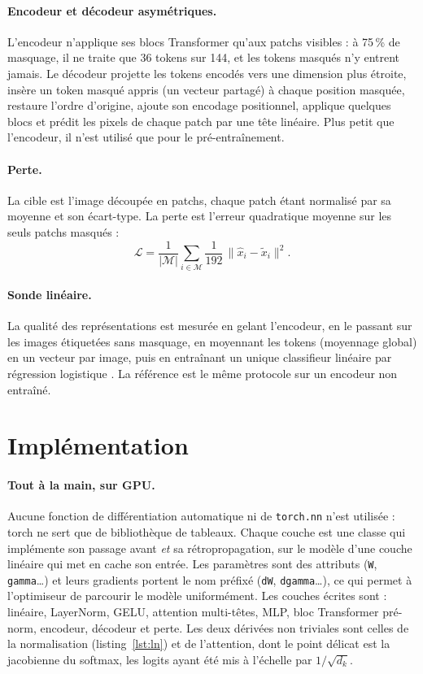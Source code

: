 \documentclass[twocolumn,10pt,a4paper]{article}
\begin{document}
\paragraph{Encodeur et décodeur asymétriques.}
L'encodeur n'applique ses blocs Transformer qu'aux patchs visibles : à 75\,\% de masquage, il ne
traite que 36 tokens sur 144, et les tokens masqués n'y entrent jamais. Le décodeur projette les
tokens encodés vers une dimension plus étroite, insère un token masqué appris (un vecteur partagé) à
chaque position masquée, restaure l'ordre d'origine, ajoute son encodage positionnel, applique
quelques blocs et prédit les pixels de chaque patch par une tête linéaire. Plus petit que
l'encodeur, il n'est utilisé que pour le pré-entraînement.

\paragraph{Perte.}
La cible est l'image découpée en patchs, chaque patch étant normalisé par sa moyenne et son
écart-type. La perte est l'erreur quadratique moyenne sur les seuls patchs masqués :
\begin{equation}
\mathcal{L} = \frac{1}{|\mathcal{M}|}\sum_{i \in \mathcal{M}}
\frac{1}{192}\,\lVert \hat{x}_i - \tilde{x}_i \rVert^2 .
\end{equation}

\paragraph{Sonde linéaire.}
La qualité des représentations est mesurée en gelant l'encodeur, en le passant sur les images
étiquetées sans masquage, en moyennant les tokens (moyennage global) en un vecteur par image, puis
en entraînant un unique classifieur linéaire par régression logistique \cite{he2022mae}. La
référence est le même protocole sur un encodeur non entraîné.

\section{Implémentation}

\paragraph{Tout à la main, sur GPU.}
Aucune fonction de différentiation automatique ni de \texttt{torch.nn} n'est utilisée : torch ne
sert que de bibliothèque de tableaux. Chaque couche est une classe qui implémente son passage avant
\emph{et} sa rétropropagation, sur le modèle d'une couche linéaire qui met en cache son entrée. Les
paramètres sont des attributs (\texttt{W}, \texttt{gamma}\dots) et leurs gradients portent le nom
préfixé (\texttt{dW}, \texttt{dgamma}\dots), ce qui permet à l'optimiseur de parcourir le modèle
uniformément. Les couches écrites sont : linéaire, LayerNorm, GELU, attention multi-têtes, MLP, bloc
Transformer pré-norm, encodeur, décodeur et perte. Les deux dérivées non triviales sont celles de la
normalisation (listing~\ref{lst:ln}) et de l'attention, dont le point délicat est la jacobienne du
softmax, les logits ayant été mis à l'échelle par $1/\sqrt{d_k}$.
\end{document}
